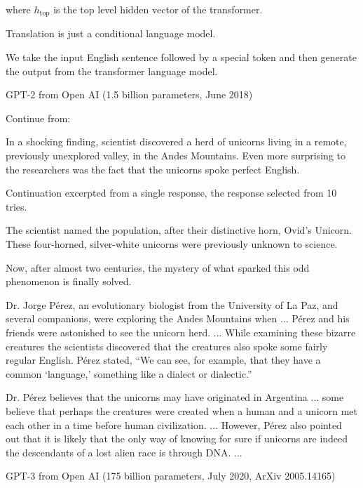 {\vfill
where $h_\mathrm{top}$ is the top level hidden vector of the transformer.


Translation is just a conditional language model.

\vfill
We take the input English sentence followed by a special token and then generate the output from the transformer language model.



GPT-2 from Open AI (1.5 billion parameters, June 2018)

\vfill
{\color{red} Continue from:}

\vfill
In a shocking finding, scientist discovered a herd of unicorns living in a remote, previously unexplored valley, in the Andes Mountains. Even more surprising to the researchers was the fact that the unicorns spoke perfect English.


{\color{red} Continuation excerpted from a single response, the response selected from 10 tries.}

\bigskip

The scientist named the population, after their distinctive horn, Ovid’s Unicorn. These four-horned, silver-white unicorns were previously unknown to science.

Now, after almost two centuries, the mystery of what sparked this odd phenomenon is finally solved.

Dr. Jorge Pérez, an evolutionary biologist from the University of La Paz, and several companions, were exploring the Andes Mountains when ...
Pérez and his friends were astonished to see the unicorn herd. ...
While examining these bizarre creatures the scientists discovered that the creatures also spoke some fairly regular English. Pérez stated, “We can see, for example, that they have a common ‘language,’ something like a dialect or dialectic.”

Dr. Pérez believes that the unicorns may have originated in Argentina ... some believe that perhaps the creatures were created when a human and a unicorn met each other in a time before human civilization. ... However, Pérez also pointed out that it is likely that the only way of knowing for sure if unicorns are indeed the descendants of a lost alien race is through DNA. ...



GPT-3 from Open AI (175 billion parameters, July 2020, ArXiv 2005.14165)

}
